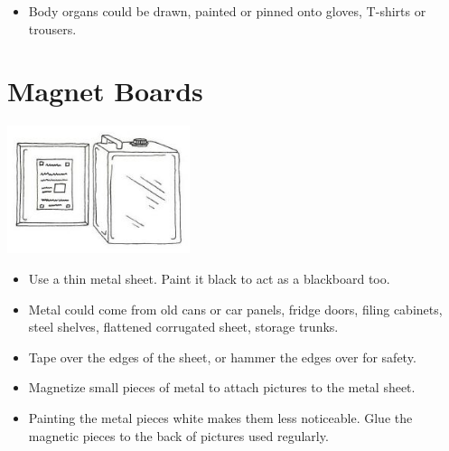 \begin{multicols}{2}
\begin{itemize}
\item Body organs could be drawn,
painted or pinned onto gloves,
T-shirts or trousers.
\end{itemize}



\section{Magnet Boards}

\begin{center}
\includegraphics[width=0.4\textwidth]{./img/vso/magnet-board.jpg}
\end{center}

\begin{itemize}
\item Use a thin metal sheet. Paint it black to act as a blackboard too.
\item Metal could come from old cans or car panels, fridge doors, filing
cabinets, steel shelves, flattened corrugated sheet, storage trunks.
\item Tape over the edges of the sheet, or hammer the edges over for
safety.
\item Magnetize small pieces of metal to attach pictures to
the metal sheet.
\item Painting the metal pieces white makes them less noticeable. Glue the
magnetic pieces to the back of pictures used regularly.
\end{itemize}


\end{multicols}
